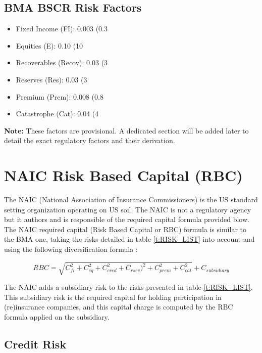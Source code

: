 \subsection{BMA BSCR Risk Factors}
\begin{itemize}
    \item Fixed Income (FI): 0.003 (0.3%
    \item Equities (E): 0.10 (10%
    \item Recoverables (Recov): 0.03 (3%
    \item Reserves (Res): 0.03 (3%
    \item Premium (Prem): 0.008 (0.8%
    \item Catastrophe (Cat): 0.04 (4%
\end{itemize}

\textbf{Note:} These factors are provisional. A dedicated section will be added later to detail the exact regulatory factors and their derivation.





\section{NAIC Risk Based Capital (RBC)}
\label{sec:NAIC_RBC_PRESENTATION}

The NAIC (National Association of Insurance Commissioners) is the US standard setting organization operating on US soil. The NAIC is not a regulatory agency but it authors and is responsible of the required capital formula provided blow. The NAIC required capital (Risk Based Capital or RBC) formula is similar to the BMA one, taking the risks detailed in table \ref{t:RISK_LIST} into account and using the following diversification formula :

\begin{equation}
	RBC = \sqrt{C_{fi}^2 + C_{eq}^2 + C_{cred}^2 + C_{rsrv} )^2 + C_{prem}^2 + C_{cat}^2} + C_{subsidiary}
\end{equation}

The NAIC adds a subsidiary risk to the risks presented in table \ref{t:RISK_LIST}. This subsidiary risk is the required capital for holding participation in (re)insurance companies, and this capital charge is computed by the RBC formula applied on the subsidiary. 

\subsection{Credit Risk}

